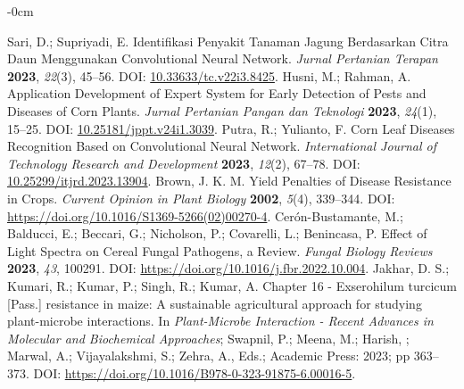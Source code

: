\documentclass[journal,article,submit,pdftex,moreauthors]{Definitions/mdpi}
\begin{document}
\begin{adjustwidth}{-\extralength}{0cm}



\begin{thebibliography}{999}
Sari, D.; Supriyadi, E. Identifikasi Penyakit Tanaman Jagung Berdasarkan Citra Daun Menggunakan Convolutional Neural Network. {\em Jurnal Pertanian Terapan} {\bf 2023}, {\em 22}(3), 45--56. DOI: \url{10.33633/tc.v22i3.8425}.
Husni, M.; Rahman, A. Application Development of Expert System for Early Detection of Pests and Diseases of Corn Plants. {\em Jurnal Pertanian Pangan dan Teknologi} {\bf 2023}, {\em 24}(1), 15--25. DOI: \url{10.25181/jppt.v24i1.3039}.
Putra, R.; Yulianto, F. Corn Leaf Diseases Recognition Based on Convolutional Neural Network. {\em International Journal of Technology Research and Development} {\bf 2023}, {\em 12}(2), 67--78. DOI: \url{10.25299/itjrd.2023.13904}.
Brown, J. K. M. Yield Penalties of Disease Resistance in Crops. {\em Current Opinion in Plant Biology} {\bf 2002}, {\em 5}(4), 339--344. DOI: \url{https://doi.org/10.1016/S1369-5266(02)00270-4}.
Cerón-Bustamante, M.; Balducci, E.; Beccari, G.; Nicholson, P.; Covarelli, L.; Benincasa, P. Effect of Light Spectra on Cereal Fungal Pathogens, a Review. {\em Fungal Biology Reviews} {\bf 2023}, {\em 43}, 100291. DOI: \url{https://doi.org/10.1016/j.fbr.2022.10.004}.
Jakhar, D. S.; Kumari, R.; Kumar, P.; Singh, R.; Kumar, A. Chapter 16 - Exserohilum turcicum [Pass.] resistance in maize: A sustainable agricultural approach for studying plant-microbe interactions. In {\em Plant-Microbe Interaction - Recent Advances in Molecular and Biochemical Approaches}; Swapnil, P.; Meena, M.; Harish, ; Marwal, A.; Vijayalakshmi, S.; Zehra, A., Eds.; Academic Press: 2023; pp 363--373. DOI: \url{https://doi.org/10.1016/B978-0-323-91875-6.00016-5}.

\end{thebibliography}
\end{adjustwidth}
\end{document}
